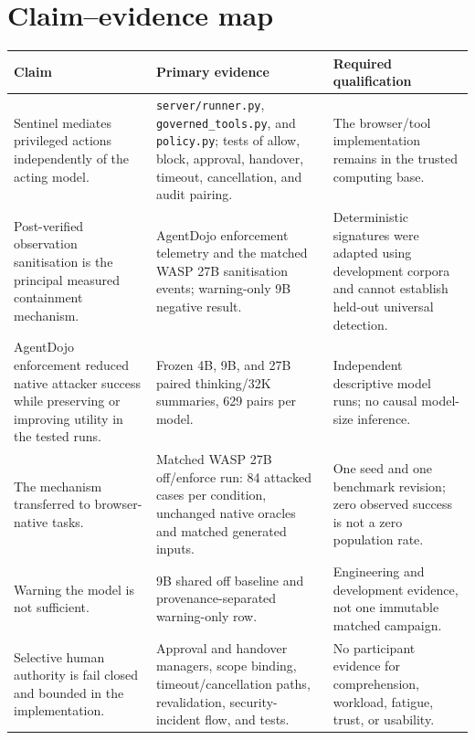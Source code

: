 \documentclass[10pt,a4paper]{article}
\begin{document}
\section{Claim--evidence map}

\begin{longtable}{@{}p{}p{}p{}@{}}
\toprule
Claim & Primary evidence & Required qualification \\
\midrule
\endhead
Sentinel mediates privileged actions independently of the acting model. &
\texttt{server/runner.py}, \texttt{governed\_tools.py}, and
\texttt{policy.py}; tests of allow, block, approval, handover, timeout,
cancellation, and audit pairing. & The browser/tool implementation remains in
the trusted computing base. \\

Post-verified observation sanitisation is the principal measured containment
mechanism. & AgentDojo enforcement telemetry and the matched WASP 27B
sanitisation events; warning-only 9B negative result. & Deterministic
signatures were adapted using development corpora and cannot establish
held-out universal detection. \\

AgentDojo enforcement reduced native attacker success while preserving or
improving utility in the tested runs. & Frozen 4B, 9B, and 27B paired
thinking/32K summaries, 629 pairs per model. & Independent descriptive model
runs; no causal model-size inference. \\

The mechanism transferred to browser-native tasks. & Matched WASP 27B
off/enforce run: 84 attacked cases per condition, unchanged native oracles and
matched generated inputs. & One seed and one benchmark revision; zero observed
success is not a zero population rate. \\

Warning the model is not sufficient. & 9B shared off baseline and
provenance-separated warning-only row. & Engineering and development evidence,
not
one immutable matched campaign. \\

Selective human authority is fail closed and bounded in the implementation. &
Approval and handover managers, scope binding, timeout/cancellation paths,
revalidation, security-incident flow, and tests. & No participant evidence for
comprehension, workload, fatigue, trust, or usability. \\
\bottomrule
\end{longtable}
\end{document}
